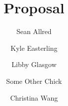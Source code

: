 \documentclass{article}
\title{Proposal}
\author{%
  Sean Allred \and
  Kyle Easterling \and
  Libby Glasgow \and
  Some Other Chick \and
  Christina Wang}
\begin{document}
\maketitle
\noindent
\end{document}
